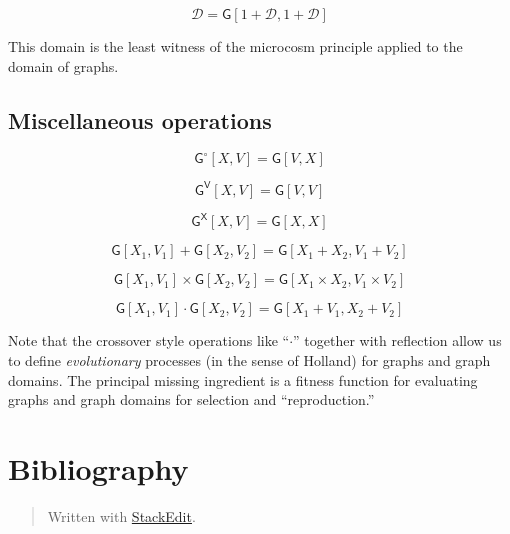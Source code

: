 \documentclass[12pt]{llncs}
\begin{document}
\[\mathcal{D} = \mathsf{G}[1 + \mathcal{D},1 + \mathcal{D}]\]

This domain is the least witness of the microcosm principle applied to
the domain of graphs.

\hypertarget{miscellaneous-operations}{%
\subsection{Miscellaneous operations}\label{miscellaneous-operations}}

\[\mathsf{G}^{\circ}[X,V] = \mathsf{G}[V,X]\]

\[\mathsf{G}^{\mathsf{V}}[X,V] = \mathsf{G}[V,V]\]

\[\mathsf{G}^{\mathsf{X}}[X,V] = \mathsf{G}[X,X]\]

\[\mathsf{G}[X_1,V_1] + \mathsf{G}[X_2,V_2] = \mathsf{G}[X_1+X_2,V_1 + V_2]\]

\[\mathsf{G}[X_1,V_1] \times \mathsf{G}[X_2,V_2] = \mathsf{G}[X_1 \times X_2,V_1 \times V_2]\]

\[\mathsf{G}[X_1,V_1] \cdot \mathsf{G}[X_2,V_2] = \mathsf{G}[X_1 + V_1,X_2 + V_2]\]

Note that the crossover style operations like ``\(\cdot\)'' together
with reflection allow us to define \emph{evolutionary} processes (in the
sense of Holland) for graphs and graph domains. The principal missing
ingredient is a fitness function for evaluating graphs and graph domains
for selection and ``reproduction.''





\hypertarget{bibliography}{%
\section{Bibliography}\label{bibliography}}
   



\begin{quote}
Written with \href{https://stackedit.io/}{StackEdit}.
\end{quote}
\end{document}
